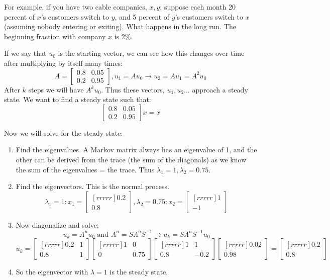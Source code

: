 \begin{example}
    For example, if you have two cable companies, $x,y$; suppose each month 20 percent of $x$'s customers switch to $y$, and 5 percent of $y$'s customers switch to $x$ (assuming nobody entering or exiting). What happens in the long run. The beginning fraction with company $x$ is 2\%.

    If we say that $u_0$ is the starting vector, we can see how this changes over time after multiplying by itself many times:
    \[A =  \begin{bmatrix} 0.8 & 0.05  \\  0.2 & 0.95 \end{bmatrix} , u_1=Au_0 \rightarrow u_2=Au_1=A^2u_0\]
    After $k$ steps we will have $A^ku_0$. Thus these vectors, $u_1,u_2 \dots$ approach a steady state. We want to find a steady state such that:
    \[\begin{bmatrix} 0.8 & 0.05  \\  0.2 & 0.95 \end{bmatrix} x = x\]

    Now we will solve for the steady state:
    \begin{enumerate}
        \item Find the eigenvalues. A Markov matrix always has an eigenvalue of 1, and the other can be derived from the trace (the sum of the diagonals) as we know the sum of the eigenvalues = the trace. Thus $\lambda_1=1, \lambda_2=0.75$.
        \item Find the eigenvectors. This is the normal process.
        \[\lambda_1=1: x_1=\begin{bmatrix}[rrrrr] 0.2  \\  0.8 \end{bmatrix}, \lambda_2=0.75: x_2=\begin{bmatrix}[rrrrr] 1  \\  -1 \end{bmatrix} \]
        \item Now diagonalize and solve:
        \[u_k=A^nu_0 \text{ and } A^n=S \Lambda^n S^{-1} \rightarrow u_k=S \Lambda^n S^{-1}u_0\]
        \[u_k = \begin{bmatrix}[rrrrr] 0.2  & 1 \\  0.8 & 1 \end{bmatrix}
        \begin{bmatrix}[rrrrr] 1  & 0 \\  0 & 0.75 \end{bmatrix}
            \begin{bmatrix}[rrrrr] 1  & 1 \\  0.8 & -0.2 \end{bmatrix}
                \begin{bmatrix}[rrrrr] 0.02 \\  0.98 \end{bmatrix}=
                    \begin{bmatrix}[rrrrr] 0.2 \\  0.8 \end{bmatrix}\]
        \item So the eigenvector with $\lambda=1$ is the steady state.
    \end{enumerate}
\end{example}

